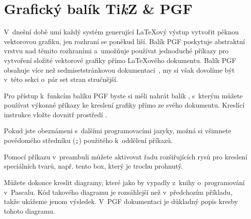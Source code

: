 \section{Grafický balík Ti\emph{k}Z \& PGF}
V~dnešní době umí každý systém generující \LaTeX ový výstup vytvořit pěknou
vektorovou grafiku, jen rozhraní se poněkud liší. Balík PGF poskytuje abstraktní
vrstvu nad těmito rozhraními a~umožňuje používat jednoduché příkazy
pro vytvoření složité vektorové grafiky přímo  \LaTeX ového dokumentu.
Balík PGF obsahuje více než sedmisetstránkovou dokumentaci~\cite{pgfplot}, 
my si však dovolíme být v~této sekci o~pár set stran stručnější. 

Pro přístup k~funkcím  balíku PGF byste si měli nahrát
balík , s~kterým můžete používat výkonné příkazy ke kreslení grafiky
přímo ze svého dokumentu. Kreslící instrukce vložte dovnitř prostředí .

\begin{example}
\end{example}
Pokud jste obeznámeni s~dalšími programovacími jazyky, možná si všimnete
povědomého středníku (\texttt{;}) použitého k~oddělení příkazů. 

Pomocí
příkazu  v~preambuli můžete aktivovat řadu rozšiřujících
rysů pro kreslení speciálních tvarů, např. tento box, který je trochu prohnutý.
\begin{example}
\usetikzlibrary{%
  decorations.pathmorphing}
\end{example}

Můžete dokonce kreslit diagramy, které jako by vypadly z~knihy o~programování
v~Pascalu. Kód takového diagramu je rozsáhlejší než v~předchozím příkladu,
takže ukážeme jenom výsledek. V~PGF dokumentaci je důkladný popis kresby
tohoto diagramu.

